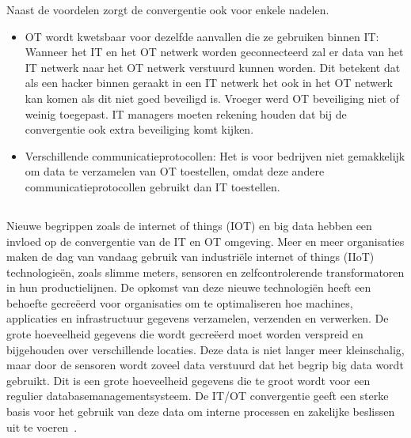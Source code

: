 Naast de voordelen zorgt de convergentie ook voor enkele nadelen.
\begin{itemize}
    \item OT wordt kwetsbaar voor dezelfde aanvallen die ze gebruiken binnen IT: Wanneer het IT en het OT netwerk worden geconnecteerd zal er data van het IT netwerk naar het OT netwerk verstuurd kunnen worden. Dit betekent dat als een hacker binnen geraakt in een IT netwerk het ook in het OT netwerk kan komen als dit niet goed beveiligd is. Vroeger werd OT beveiliging niet of weinig toegepast. IT managers moeten rekening houden dat bij de convergentie ook extra beveiliging komt kijken. 
    \item Verschillende communicatieprotocollen: Het is voor bedrijven niet gemakkelijk om data te verzamelen van OT toestellen, omdat deze andere communicatieprotocollen gebruikt dan IT toestellen.
\end{itemize}

\subsection{}
\label{sec:Nieuwe begrippen leiden tot de convergentie}
Nieuwe begrippen zoals de internet of things (IOT) en big data hebben een invloed op de convergentie van de IT en OT omgeving. Meer en meer organisaties maken de dag van vandaag gebruik van industriële internet of things (IIoT) technologieën, zoals slimme meters, sensoren en zelfcontrolerende transformatoren in hun productielijnen. De opkomst van deze nieuwe technologiën heeft een behoefte gecreëerd voor organisaties om te optimaliseren hoe machines, applicaties en infrastructuur gegevens verzamelen, verzenden en verwerken. De grote hoeveelheid gegevens die wordt gecreëerd moet worden verspreid en bijgehouden over verschillende locaties. Deze data is niet langer meer kleinschalig, maar door de sensoren wordt zoveel data verstuurd dat het begrip big data wordt gebruikt. Dit is een grote hoeveelheid gegevens die te groot wordt voor een regulier databasemanagementsysteem. De IT/OT convergentie geeft een sterke basis voor het gebruik van deze data om interne processen en zakelijke beslissen uit te voeren~\autocite{Tiempo2020}.

